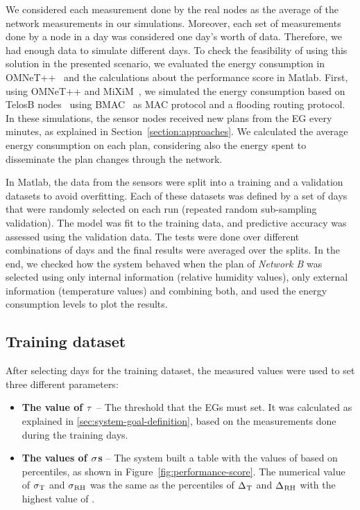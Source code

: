 \documentclass{llncs}
\newcommand{\EG}[1]{EG}
\newcommand{\ourDelta}[2][]{\ensuremath{\Delta\textsuperscript{\text{#1}}
\textsubscript{\text{#2}}}}
\newcommand{\threshold}[1][]{\ensuremath{\tau\textsubscript{#1}}}
\newcommand{\symptom}[1][]{\ensuremath{\sigma\textsubscript{#1}}}
\begin{document}
We considered each measurement done by the real nodes as the average of the 
network measurements in our simulations. 
Moreover, each set of measurements done by a node in a day was considered one 
day's worth of data. Therefore, we had enough data to simulate  different 
days.
To check the feasibility of using this solution in the presented 
scenario, we evaluated the energy consumption in OMNeT++~\cite{Varga2001} and 
the calculations about the performance score in Matlab.
First, using OMNeT++ and MiXiM~\cite{Kopke}, we simulated the energy 
consumption based on TelosB nodes~\cite{Platform} using BMAC~\cite{Fakih2006} as 
MAC protocol and a flooding routing protocol. 
In these simulations, the sensor nodes received new plans from the \EG{} every 
 minutes, as explained in Section~\ref{section:approaches}. We calculated 
the average energy consumption on each plan, considering also the energy spent 
to disseminate the plan changes through the network. 

In Matlab, the data from the sensors were split into a training and a validation 
datasets to avoid overfitting. Each of these datasets was defined by a set of 
 days that were randomly selected on each run (repeated random sub-sampling 
validation). The model was fit to the training data, and predictive accuracy was 
assessed using the validation data. The tests were done over  different 
combinations of days and the final results were averaged over the splits. In the 
end, we checked how the system behaved when the plan of \emph{Network B} was 
selected using only internal information (relative humidity values), only 
external information (temperature values) and combining both, and used the 
energy consumption levels to plot the results. 

\subsection{Training dataset}

After selecting  days for the training dataset, the measured values were 
used to set three different parameters: 

\begin{itemize}
 \item \textbf{The value of \threshold{}} -- The threshold that the 
\EG{}s must set. It was calculated as explained in 
\ref{sec:system-goal-definition}, based on the measurements done during the 
training days.
 \item \textbf{The values of \symptom{}s} -- The system built a table with the 
values of  based on percentiles, as shown in 
Figure~\ref{fig:performance-score}. The 
numerical value of \symptom[T] and \symptom[RH] was the same as the 
percentiles of \ourDelta{T} and \ourDelta{RH}  with the highest value 
of .
\end{itemize}
\end{document}
